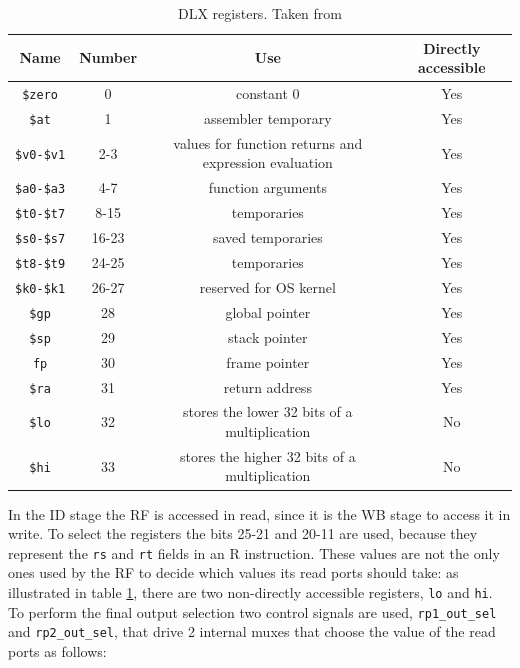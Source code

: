 \begin{table}[!ht]
    \centering
    \begin{tabular}{ |c|c|c|c| }
        \hline
        Name & Number & Use & Directly accessible \\

        \hline
        \verb|$zero| & 0 & constant 0 & Yes \\
        \hline
        \verb|$at| & 1 & assembler temporary & Yes \\
        \hline
        \verb|$v0-$v1| & 2-3 & values for function returns and expression evaluation & Yes \\
        \hline
        \verb|$a0-$a3| & 4-7 & function arguments & Yes \\
        \hline
        \verb|$t0-$t7| & 8-15 & temporaries & Yes \\
        \hline
        \verb|$s0-$s7| & 16-23 & saved temporaries & Yes \\
        \hline
        \verb|$t8-$t9| & 24-25 & temporaries & Yes \\
        \hline
        \verb|$k0-$k1| & 26-27 & reserved for OS kernel & Yes \\
        \hline
        \verb|$gp| & 28 & global pointer & Yes \\
        \hline
        \verb|$sp| & 29 & stack pointer & Yes \\
        \hline
        \verb|fp| & 30 & frame pointer & Yes \\
        \hline
        \verb|$ra| & 31 & return address & Yes \\
        \hline
        \verb|$lo| & 32 & stores the lower 32 bits of a multiplication & No \\
        \hline
        \verb|$hi| & 33 & stores the higher 32 bits of a multiplication & No \\
        \hline
    \end{tabular}
    \caption{DLX registers. Taken from \cite{abi_regs}}
    \label{tab:registers}
\end{table}

In the ID stage the RF is accessed in read, since it is the WB stage to access it in write. To select the registers the bits 25-21 and 20-11 are used,
because they represent the \verb|rs| and \verb|rt| fields in an R instruction. These values are not the only ones used by the RF to decide which values
its read ports should take: as illustrated in table \ref{tab:registers}, there are two non-directly accessible registers, \verb|lo| and \verb|hi|. To perform
the final output selection two control signals are used, \verb|rp1_out_sel| and \verb|rp2_out_sel|, that drive 2 internal muxes that choose the value of the read ports as follows:

